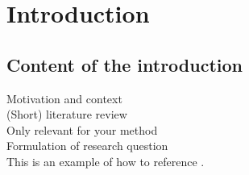 

\chapter{Introduction}
\label{chap:intro}
\pagestyle{fancy}

\section{Content of the introduction}
Motivation and context\\
(Short) literature review \\ 
Only relevant for your method \\ 
Formulation of research question \\

This is an example of how to reference \cite{LA_top10_US}.